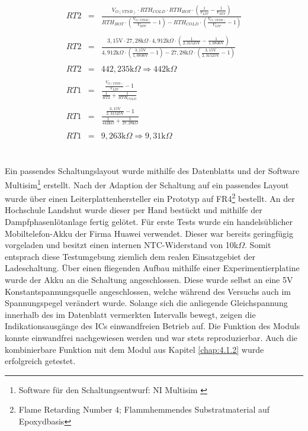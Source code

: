 \documentclass[12pt]{scrreprt} %
\begin{document}
\begin{eqnarray}
RT2&=&\frac{V_{O(VTSB)} \cdot RTH_{COLD} \cdot RTH_{HOT} \cdot \left( \frac{1}{V_{LTF}}-\frac{1}{V_{HTF}}\right)}{RTH_{HOT} \cdot \left( \frac{V_{O(VTSB)}}{V_{HTF}}-1\right)-RTH_{COLD} \cdot \left( \frac{V_{O(VTSB)}}{V_{LTF}}-1 \right)}\\
\nonumber\\
RT2&=&\frac{3,15\text{V} \cdot 27,28\text{k}\Omega \cdot4,912\text{k}\Omega \cdot \left( \frac{1}{2,31525\text{V}}-\frac{1}{1,0836\text{V}}\right)}{4,912\text{k}\Omega \cdot \left( \frac{3,15\text{V}}{1,0836\text{V}}-1\right)-27,28\text{k}\Omega \cdot \left( \frac{3,15\text{V}}{2,31525\text{V}}-1 \right)}\\
\nonumber\\
RT2&=& 442,235 \text{k} \Omega \Rightarrow 442\text{k} \Omega\\
\nonumber\\
RT1&=&\frac{\frac{V_{O(VTSB)}}{V_{LTF}}-1}{\frac{1}{RT2}+\frac{1}{RTH_{COLD}}}\\
\nonumber\\
RT1&=&\frac{\frac{3,15\text{V}}{2,31525\text{V}}-1}{\frac{1}{442\text{k} \Omega}+\frac{1}{27,28\text{k}\Omega}}\\
\nonumber\\
RT1&=&9,263\text{k}\Omega \Rightarrow 9,31\text{k}\Omega
\end{eqnarray}
\\
\\
Ein passendes Schaltungslayout wurde mithilfe des Datenblatts \citep{BQ24100} und der Software Multisim\footnote{Software für den Schaltungsentwurf: NI Multisim \citep{multisim}} erstellt. Nach der Adaption der Schaltung auf ein passendes Layout wurde über einen Leiterplattenhersteller ein Prototyp auf FR4\footnote{Flame Retarding Number 4; Flammhemmendes Substratmaterial auf Epoxydbasis} bestellt. An der Hochschule Landshut wurde dieser per Hand bestückt und mithilfe der Dampfphasenlötanlage fertig gelötet. Für erste Tests wurde ein handelsüblicher Mobiltelefon-Akku der Firma Huawei verwendet. Dieser war bereits geringfügig vorgeladen und besitzt einen internen NTC-Widerstand von 10k$\Omega$. Somit entsprach diese Testumgebung ziemlich dem realen Einsatzgebiet der Ladeschaltung. Über einen fliegenden Aufbau mithilfe einer Experimentierplatine wurde der Akku an die Schaltung angeschlossen. Diese wurde selbst an eine 5V Konstantspannungsquelle angeschlossen, welche während des Versuchs auch im Spannungspegel verändert wurde. Solange sich die anliegende Gleichspannung innerhalb des im Datenblatt vermerkten Intervalls bewegt, zeigen die Indikationsausgänge des ICs einwandfreien Betrieb auf. Die Funktion des Moduls konnte einwandfrei nachgewiesen werden und war stets reproduzierbar. Auch die kombinierbare Funktion mit dem Modul aus Kapitel \vref{chap:4.1.2} wurde erfolgreich getestet.
\end{document}
